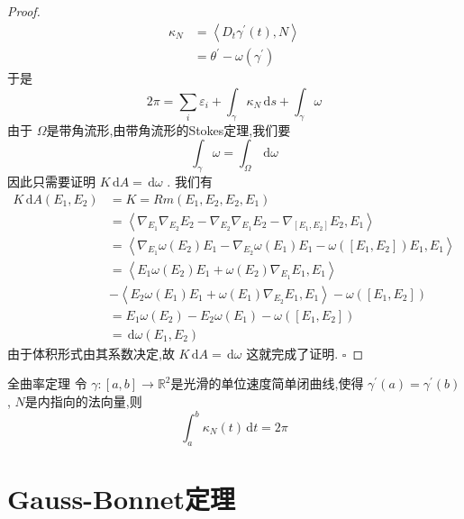 \documentclass[../../main.tex]{subfiles}
\begin{document}
\begin{proof}
\[\begin{aligned}
     \kappa _{N}&= \left<D_{t} \gamma ^{\prime} \left( t \right),N  \right> \\ 
      & =  \theta ^{\prime} -  \omega \left(  \gamma ^{\prime}  \right) 
    \end{aligned}
    \]于是 \[
    2\pi = \sum _{i} \varepsilon _{i}+\int_{ \gamma } \kappa _{N}\,\mathrm{d} s + \int_{ \gamma } \omega  
    \]由于 \(   \Omega   \)是带角流形,由带角流形的Stokes定理,我们要 \[
    \int_{ \gamma } \omega = \int_{ \Omega }\,\mathrm{d}  \omega 
    \] 因此只需要证明 \(  K\,\mathrm{d} A= \,\mathrm{d}  \omega   \) .
    我们有 \[
    \begin{aligned}
    K\,\mathrm{d} A\left( E_1,E_2 \right)& = K=   Rm \left( E_1,E_2,E_2,E_1 \right) \\ 
     & = \left< \nabla _{E_1} \nabla _{E_2}E_2- \nabla _{E_2} \nabla _{E_1}E_2- \nabla _{\left[ E_1,E_2 \right] }E_2,E_1 \right>\\ 
      & = \left< \nabla _{E_1} \omega \left( E_2 \right)E_1- \nabla _{E_2} \omega \left( E_1 \right)E_1-  \omega \left( \left[ E_1,E_2 \right]  \right)E_1,E_1    \right>\\ 
       & = \left<E_1 \omega \left( E_2 \right)E_1+  \omega \left( E_2 \right) \nabla _{E_1}E_1  ,E_1 \right>\\ 
        & -\left<E_2 \omega \left( E_1 \right)E_1+  \omega \left( E_1 \right) \nabla _{E_2}E_1  ,E_1 \right>- \omega \left( [E_1,E_2] \right) \\ 
         & = E_1 \omega \left( E_2 \right)-E_2 \omega \left( E_1 \right)- \omega \left( [E_1,E_2] \right)   \\ 
          & = \,\mathrm{d}  \omega \left( E_1,E_2 \right) 
    \end{aligned}
    \]由于体积形式由其系数决定,故 \( K \,\mathrm{d} A= \,\mathrm{d}  \omega   \) 这就完成了证明.
    \hfill $\square$
\end{proof}
\begin{corollary}{全曲率定理}
    令 \(   \gamma :\left[ a,b \right]\to \mathbb{R} ^{2}   \)是光滑的单位速度简单闭曲线,使得 \(   \gamma ^{\prime} \left( a \right)=  \gamma ^{\prime} \left( b \right)    \), \(  N  \)是内指向的法向量,则 \[
    \int_{a}^{b} \kappa _{N}\left( t \right)\,\mathrm{d} t= 2\pi
    \]   
\end{corollary}

\section{Gauss-Bonnet定理}
\end{document}
